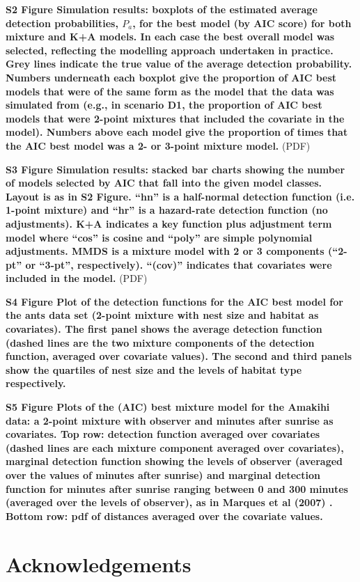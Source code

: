 \documentclass[10pt]{article}
\begin{document}
\textbf{S2 Figure Simulation results: boxplots of the estimated average detection probabilities, $P_a$, for the best model (by AIC score) for both mixture and K+A models. In each case the best overall model was selected, reflecting the modelling approach undertaken in practice. Grey lines indicate the true value of the average detection probability. Numbers underneath each boxplot give the proportion of AIC best models that were of the same form as the model that the data was simulated from (e.g., in scenario D1, the proportion of AIC best models that were 2-point mixtures that included the covariate in the model). Numbers above each model give the proportion of times that the AIC best model was a 2- or 3-point mixture model.} (PDF)

\textbf{S3 Figure Simulation results: stacked bar charts showing the number of models selected by AIC that fall into the given model classes. Layout is as in S2 Figure. ``hn'' is a half-normal detection function (i.e. 1-point mixture) and ``hr'' is a hazard-rate detection function (no adjustments). K+A indicates a key function plus adjustment term model where ``cos'' is cosine and ``poly'' are simple polynomial adjustments. MMDS is a mixture model with 2 or 3 components (``2-pt'' or ``3-pt'', respectively). ``(cov)'' indicates that covariates were included in the model.} (PDF)

\textbf{S4 Figure Plot of the detection functions for the AIC best model for the ants data set (2-point mixture with nest size and habitat as covariates). The first panel shows the average detection function (dashed lines are the two mixture components of the detection function, averaged over covariate values). The second and third panels show the quartiles of nest size and the levels of habitat type respectively.}

\textbf{S5 Figure Plots of the (AIC) best mixture model for the Amakihi data: a 2-point mixture with observer and minutes after sunrise as covariates. Top row: detection function averaged over covariates (dashed lines are each mixture component averaged over covariates), marginal detection function showing the levels of observer (averaged over the values of minutes after sunrise) and marginal detection function for minutes after sunrise ranging between 0 and 300 minutes (averaged over the levels of observer), as in Marques et al (2007) \cite{Marques:2007vm}. Bottom row: pdf of distances averaged over the covariate values.}


\section*{Acknowledgements}
\end{document}
